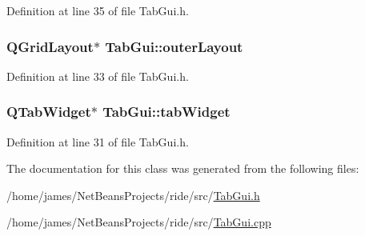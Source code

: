 Definition at line 35 of file Tab\-Gui.\-h.

\hypertarget{class_tab_gui_a6d33a663f8871b856495286a691a88f8}{
\subsubsection[{outer\-Layout}]{\setlength{\rightskip}{0pt plus 5cm}Q\-Grid\-Layout$\ast$ Tab\-Gui\-::outer\-Layout\hspace{0.3cm}{\ttfamily [private]}}}\label{class_tab_gui_a6d33a663f8871b856495286a691a88f8}


Definition at line 33 of file Tab\-Gui.\-h.

\hypertarget{class_tab_gui_ab036ccdd9eba80231890f11bff7557cc}{
\subsubsection[{tab\-Widget}]{\setlength{\rightskip}{0pt plus 5cm}Q\-Tab\-Widget$\ast$ Tab\-Gui\-::tab\-Widget\hspace{0.3cm}{\ttfamily [private]}}}\label{class_tab_gui_ab036ccdd9eba80231890f11bff7557cc}


Definition at line 31 of file Tab\-Gui.\-h.



The documentation for this class was generated from the following files\-:\begin{DoxyCompactItemize}
\item 
/home/james/\-Net\-Beans\-Projects/ride/src/\hyperlink{_tab_gui_8h}{Tab\-Gui.\-h}\item 
/home/james/\-Net\-Beans\-Projects/ride/src/\hyperlink{_tab_gui_8cpp}{Tab\-Gui.\-cpp}\end{DoxyCompactItemize}
